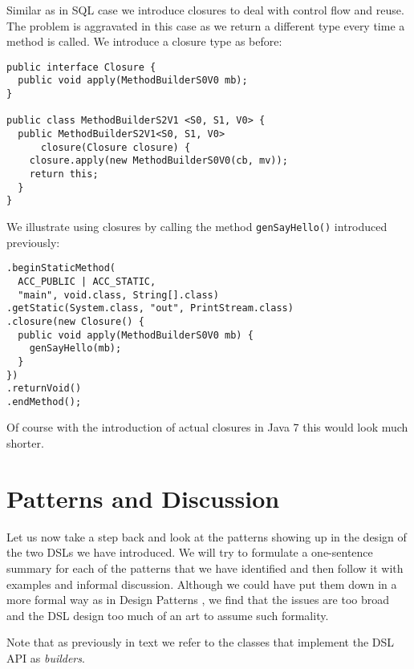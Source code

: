 \documentclass{sig-alternate}
\begin{document}
Similar as in SQL case we introduce closures to deal with control flow and reuse. The problem is aggravated in this case as we return a different type every time a method is called. We introduce a closure type as before:

\begin{verbatim}
public interface Closure {
  public void apply(MethodBuilderS0V0 mb);
}

public class MethodBuilderS2V1 <S0, S1, V0> {
  public MethodBuilderS2V1<S0, S1, V0> 
      closure(Closure closure) {
    closure.apply(new MethodBuilderS0V0(cb, mv));
    return this;
  }
}
\end{verbatim}

We illustrate using closures by calling the method \verb!genSayHello()! introduced previously:

\begin{verbatim}
.beginStaticMethod(
  ACC_PUBLIC | ACC_STATIC, 
  "main", void.class, String[].class)
.getStatic(System.class, "out", PrintStream.class)
.closure(new Closure() {
  public void apply(MethodBuilderS0V0 mb) {
    genSayHello(mb);
  }
})
.returnVoid()
.endMethod();
\end{verbatim}

Of course with the introduction of actual closures in Java 7 this would look much shorter.

\section{Patterns and Discussion}

Let us now take a step back and look at the patterns showing up in the design of the two DSLs we have introduced. We will try to formulate a one-sentence summary for each of the patterns that we have identified and then follow it with examples and informal discussion. Although we could have put them down in a more formal way as in Design Patterns \cite{gamma1995dpe}, we find that the issues are too broad and the DSL design too much of an art to assume such formality.

Note that as previously in text we refer to the classes that implement the DSL API as \emph{builders}. 
\end{document}
